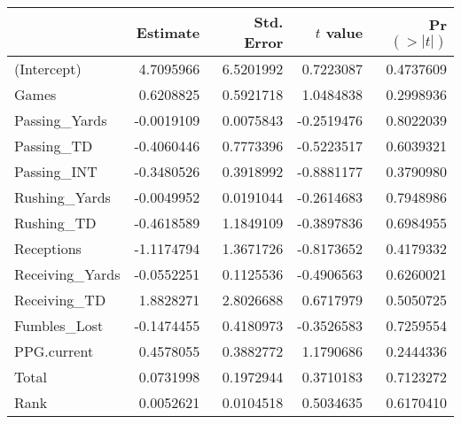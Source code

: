 
\begin{tabular}{lrrrr}
\toprule
  & Estimate & Std. Error & $t$ value & Pr$(>|t|)$\\
\midrule
(Intercept) & 4.7095966 & 6.5201992 & 0.7223087 & 0.4737609\\
Games & 0.6208825 & 0.5921718 & 1.0484838 & 0.2998936\\
Passing\_Yards & -0.0019109 & 0.0075843 & -0.2519476 & 0.8022039\\
Passing\_TD & -0.4060446 & 0.7773396 & -0.5223517 & 0.6039321\\
Passing\_INT & -0.3480526 & 0.3918992 & -0.8881177 & 0.3790980\\
Rushing\_Yards & -0.0049952 & 0.0191044 & -0.2614683 & 0.7948986\\
Rushing\_TD & -0.4618589 & 1.1849109 & -0.3897836 & 0.6984955\\
Receptions & -1.1174794 & 1.3671726 & -0.8173652 & 0.4179332\\
Receiving\_Yards & -0.0552251 & 0.1125536 & -0.4906563 & 0.6260021\\
Receiving\_TD & 1.8828271 & 2.8026688 & 0.6717979 & 0.5050725\\
Fumbles\_Lost & -0.1474455 & 0.4180973 & -0.3526583 & 0.7259554\\
PPG.current & 0.4578055 & 0.3882772 & 1.1790686 & 0.2444336\\
Total & 0.0731998 & 0.1972944 & 0.3710183 & 0.7123272\\
Rank & 0.0052621 & 0.0104518 & 0.5034635 & 0.6170410\\
\bottomrule
\end{tabular}

